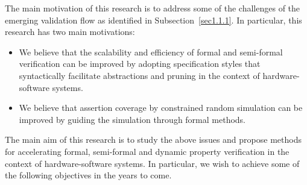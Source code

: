 \noindent
The main motivation of this research is to address some of the challenges 
of the emerging validation flow as identified in Subsection~\ref{sec1.1.1}. 
In particular, this research has two main motivations:

\begin{itemize}

\item We believe that the scalability and efficiency of formal and
    semi-formal verification can be improved by adopting specification styles
    that syntactically facilitate abstractions and pruning in the context 
    of hardware-software systems.

\item We believe that assertion coverage by constrained random 
    simulation can be improved by guiding the simulation through formal
    methods.
\end{itemize}

\noindent
The main aim of this research is to study the above issues
and propose methods for accelerating formal, semi-formal and dynamic
property verification in the context of hardware-software systems. 
In particular, we wish to achieve some of the following objectives 
in the years to come.

